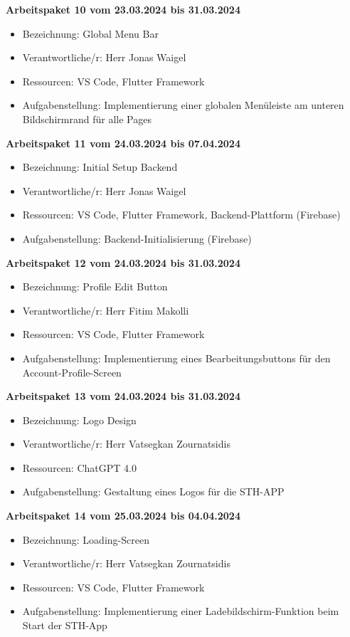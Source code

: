 \textbf{Arbeitspaket 10 vom 23.03.2024 bis 31.03.2024}
\begin{itemize}[itemsep=0pt]
    \item{Bezeichnung: Global Menu Bar} 
	\item{Verantwortliche/r: Herr Jonas Waigel} 
	\item{Ressourcen: VS Code, Flutter Framework} 
    \item{Aufgabenstellung: Implementierung einer globalen Menüleiste am unteren Bildschirmrand für alle Pages}
\end{itemize} 

\textbf{Arbeitspaket 11 vom 24.03.2024 bis 07.04.2024}
\begin{itemize}[itemsep=0pt]
    \item{Bezeichnung: Initial Setup Backend} 
	\item{Verantwortliche/r: Herr Jonas Waigel} 
	\item{Ressourcen: VS Code, Flutter Framework, Backend-Plattform (Firebase)}
    \item{Aufgabenstellung: Backend-Initialisierung (Firebase)}
\end{itemize}

\textbf{Arbeitspaket 12 vom 24.03.2024 bis 31.03.2024}
\begin{itemize}[itemsep=0pt]
    \item{Bezeichnung: Profile Edit Button} 
	\item{Verantwortliche/r: Herr Fitim Makolli} 
	\item{Ressourcen: VS Code, Flutter Framework} 
    \item{Aufgabenstellung: Implementierung eines Bearbeitungsbuttons für den Account-Profile-Screen}
\end{itemize}

\textbf{Arbeitspaket 13 vom 24.03.2024 bis 31.03.2024}
\begin{itemize}[itemsep=0pt]
    \item{Bezeichnung: Logo Design} 
	\item{Verantwortliche/r: Herr Vatsegkan Zournatsidis} 
	\item{Ressourcen: ChatGPT 4.0}
    \item{Aufgabenstellung: Gestaltung eines Logos für die STH-APP}
\end{itemize} 

\textbf{Arbeitspaket 14 vom 25.03.2024 bis 04.04.2024}
\begin{itemize}[itemsep=0pt]
    \item{Bezeichnung: Loading-Screen} 
	\item{Verantwortliche/r: Herr Vatsegkan Zournatsidis} 
	\item{Ressourcen: VS Code, Flutter Framework} 
    \item{Aufgabenstellung: Implementierung einer Ladebildschirm-Funktion beim Start der STH-App}
\end{itemize}

